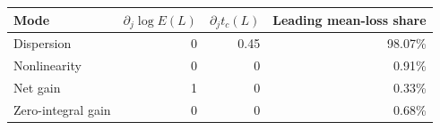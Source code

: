 \begin{tabular}{lrrr}
\toprule
Mode & $\partial_j\log E(L)$ & $\partial_j t_c(L)$ & Leading mean-loss share\\
\midrule
Dispersion & 0 & 0.45 & 98.07\%\\
Nonlinearity & 0 & 0 & 0.91\%\\
Net gain & 1 & 0 & 0.33\%\\
Zero-integral gain & 0 & 0 & 0.68\%\\
\bottomrule
\end{tabular}